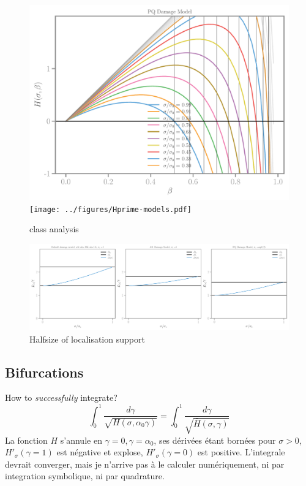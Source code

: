 \documentclass[]{article}
\begin{document}
\begin{figure}[htbp]
  \includegraphics[width=.312\textheight, angle=90]{../figures/pq-Hbeta.pdf}
  \texttt{[image: ../figures/Hprime-models.pdf]}
  \caption{class analysis}
  \label{fig:class-analyser}
\end{figure}


\begin{figure}[htbp]
  \centering
  \includegraphics[width=\textwidth]{../figures/localisation-support-models.pdf}
  \caption{Halfsize of localisation support}
  \label{fig:support-analyser}
\end{figure}


\clearpage

\subsection*{Bifurcations}
How to \emph{successfully} integrate? 
$$ 
\int_0^{1} \frac{d \gamma}{\sqrt{H(\sigma, \alpha_0 \gamma)}} = \int_0^{1} \frac{d \gamma}{\sqrt{\bar H(\sigma,\gamma)}}
$$
La fonction $H$ s'annule en $\gamma=0, \gamma=\alpha_0$, ses dérivées étant bornées pour $\sigma>0$, 
$H'_\sigma(\gamma=1)$ est négative et explose, $H'_\sigma(\gamma=0)$ est positive.
L'integrale devrait converger, mais je n'arrive pas à le calculer numériquement, ni par integration symbolique, ni par quadrature.
\end{document}
